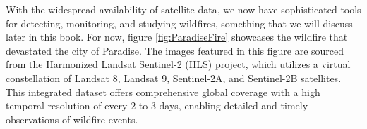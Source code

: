 \documentclass[
  12 pt,
]{Nemilov}
\begin{document}
With the widespread availability of satellite data, we now have sophisticated tools for detecting, monitoring, and studying wildfires, something that we will discuss later in this book. For now, figure \ref{fig:ParadiseFire} showcases the wildfire that devastated the city of Paradise. The images featured in this figure are sourced from the Harmonized Landsat Sentinel-2 (HLS) project, which utilizes a virtual constellation of Landsat 8, Landsat 9, Sentinel-2A, and Sentinel-2B satellites. This integrated dataset offers comprehensive global coverage with a high temporal resolution of every 2 to 3 days, enabling detailed and timely observations of wildfire events.

\begin{figure}


\end{figure}
\end{document}
